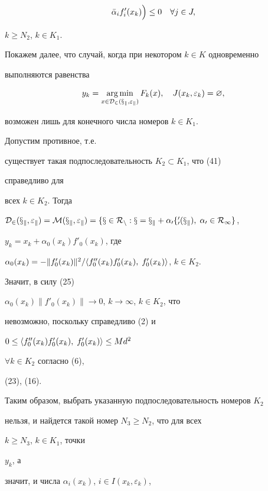 \begin{pf}
\begin{gather}
\Bar\alpha_if'_i(x_k)\Bigr)\le 0


\quad \forall j\in J,


\end{gather}


$k\ge N_2$, $k\in K_1$.





Покажем далее, что случай, когда при некотором $k\in K$ одновременно


выполняются равенства


\begin{equation}


y_k=\argmin_{x\in\cal D_2(x_k,\varepsilon_k)}F_k(x),\quad


J(x_k,\varepsilon_k)=\varnothing,


\end{equation}


возможен лишь для конечного числа номеров $k\in K_1$.


Допустим противное, т.е.


существует такая подпоследовательность $K_2\subset K_1$, что (41)


справедливо для


всех $k\in K_2$. Тогда


$\cal D_2(x_k,\varepsilon_k)=M(x_k,\varepsilon_k)=


\{x\in R_n:x=x_k+\alpha_0f'_0(x_k),\;\alpha_0\in R_1\}$,


$y_k=x_k+\alpha_0(x_k)f'_0(x_k)$, где


$\alpha_0(x_k)=-\|f'_0(x_k)\|^2/\la f''_0(x_k)f'_0(x_k),\;


f'_0(x_k)\ra$, $k\in K_2$.


Значит, в силу (25)


$\alpha_0(x_k)\|f'_0(x_k)\|\to 0$, $k\to\infty$, $k\in K_2$, что


невозможно, поскольку справедливо (2) и


$0\le\langle f''_0(x_k)f'_0(x_k),\;f'_0(x_k)\rangle\le Md^2$


$\forall k\in K_2$ согласно (6),


(23), (16).


Таким образом, выбрать указанную подпоследовательность номеров $K_2$


нельзя, и найдется такой номер $N_3\ge N_2$, что для всех


$k\ge N_3$, $k\in K_1$, точки


$y_k$, а


значит, и числа $\alpha_i(x_k)$, $i\in I(x_k,\varepsilon_k)$,



\end{pf}
